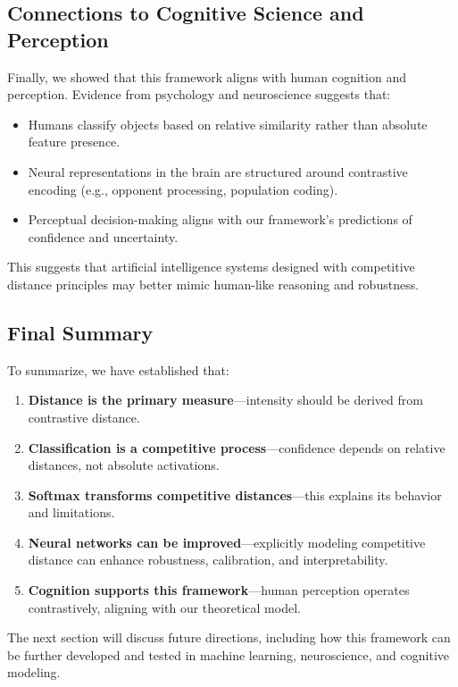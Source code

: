 \subsection{Connections to Cognitive Science and Perception}

Finally, we showed that this framework aligns with human cognition and perception. Evidence from psychology and neuroscience suggests that:

\begin{itemize}
    \item Humans classify objects based on relative similarity rather than absolute feature presence.
    \item Neural representations in the brain are structured around contrastive encoding (e.g., opponent processing, population coding).
    \item Perceptual decision-making aligns with our framework’s predictions of confidence and uncertainty.
\end{itemize}

This suggests that artificial intelligence systems designed with competitive distance principles may better mimic human-like reasoning and robustness.

\subsection{Final Summary}

To summarize, we have established that:

\begin{enumerate}
    \item \textbf{Distance is the primary measure}—intensity should be derived from contrastive distance.
    \item \textbf{Classification is a competitive process}—confidence depends on relative distances, not absolute activations.
    \item \textbf{Softmax transforms competitive distances}—this explains its behavior and limitations.
    \item \textbf{Neural networks can be improved}—explicitly modeling competitive distance can enhance robustness, calibration, and interpretability.
    \item \textbf{Cognition supports this framework}—human perception operates contrastively, aligning with our theoretical model.
\end{enumerate}

The next section will discuss future directions, including how this framework can be further developed and tested in machine learning, neuroscience, and cognitive modeling.
